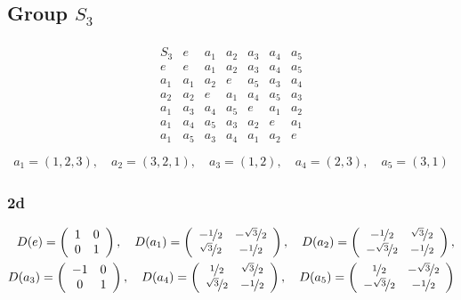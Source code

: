 \documentclass[10pt,a4paper]{article}
\theoremstyle{definition}
\begin{document}
\subsection{Group \texorpdfstring{$S_3$}{TEXT}}
\begin{align}
\begin{array}{c||cccccc}
S_3 & e   & a_1 & a_2 & a_3 & a_4 & a_5\\ \hline\hline
e   & e   & a_1 & a_2 & a_3 & a_4 & a_5\\
a_1 & a_1 & a_2 & e   & a_5 & a_3 & a_4 \\
a_2 & a_2 & e   & a_1 & a_4 & a_5 & a_3 \\
a_1 & a_3 & a_4 & a_5 & e   & a_1 & a_2 \\
a_1 & a_4 & a_5 & a_3 & a_2 & e   & a_1 \\
a_1 & a_5 & a_3 & a_4 & a_1 & a_2 & e \\
\end{array}
\end{align}
\begin{align}
a_1=(1,2,3),\quad a_2=(3,2,1),\quad a_3=(1,2),\quad a_4=(2,3),\quad a_5=(3, 1) 
\end{align}

\subsubsection{2d}
\begin{align}
D(e)=\left(\begin{array}{cc}
1 & 0\\
0 & 1
\end{array}
\right),\quad
D(a_1)=\left(\begin{array}{cc}
-\nicefrac{1}{2} & -\nicefrac{\sqrt{3}}{2}\\
 \nicefrac{\sqrt{3}}{2} & -\nicefrac{1}{2}
\end{array}
\right),\quad
D(a_2)=\left(\begin{array}{cc}
-\nicefrac{1}{2} & \nicefrac{\sqrt{3}}{2}\\
-\nicefrac{\sqrt{3}}{2} & -\nicefrac{1}{2}
\end{array}
\right),\\
D(a_3)=\left(\begin{array}{cc}
-1 & 0\\
0 & 1
\end{array}
\right),\quad
D(a_4)=\left(\begin{array}{cc}
\nicefrac{1}{2} & \nicefrac{\sqrt{3}}{2}\\
\nicefrac{\sqrt{3}}{2} & -\nicefrac{1}{2}
\end{array}
\right),\quad
D(a_5)=\left(\begin{array}{cc}
\nicefrac{1}{2} & -\nicefrac{\sqrt{3}}{2}\\
-\nicefrac{\sqrt{3}}{2} & -\nicefrac{1}{2}
\end{array}
\right)
\end{align}
\end{document}
